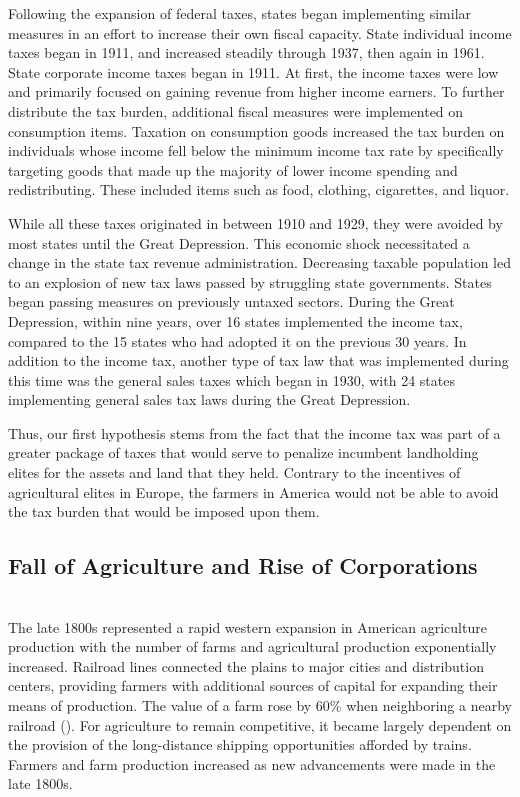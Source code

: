 \documentclass[letter, 12pt]{article}
\begin{document}
Following the expansion of federal taxes, states began implementing similar measures in an effort to increase their own fiscal capacity. State individual income taxes began in 1911, and increased steadily through 1937, then again in 1961. State corporate income taxes began in 1911. At first, the income taxes were low and primarily focused on gaining revenue from higher income earners. To further distribute the tax burden, additional fiscal measures were implemented on consumption items. Taxation on consumption goods increased the tax burden on individuals whose income fell below the minimum income tax rate by specifically targeting goods that made up the majority of lower income spending and redistributing. These included items such as food, clothing, cigarettes, and liquor.

While all these taxes originated in between 1910 and 1929, they were avoided by most states until the Great Depression. This economic shock necessitated a change in the state tax revenue administration. Decreasing taxable population led to an explosion of new tax laws passed by struggling state governments. States began passing measures on previously untaxed sectors. During the Great Depression, within nine years, over 16 states implemented the income tax, compared to the 15 states who had adopted it on the previous 30 years. In addition to the income tax, another type of tax law that was implemented during this time was the general sales taxes which began in 1930, with 24 states implementing general sales tax laws during the Great Depression. 

Thus, our first hypothesis stems from the fact that the income tax was part of a greater package of taxes that would serve to penalize incumbent landholding elites for the assets and land that they held. Contrary to the incentives of agricultural elites in Europe, the farmers in America would not be able to avoid the tax burden that would be imposed upon them. 

\subsection{Fall of Agriculture and Rise of Corporations}\hfill\\


The late 1800s represented a rapid western expansion in American agriculture production with the number of farms and agricultural production exponentially increased. Railroad lines connected the plains to major cities and distribution centers, providing farmers with additional sources of capital for expanding their means of production. The value of a farm rose by 60\% when neighboring a nearby railroad (\citealt{donaldson2016railroads}). For agriculture to remain competitive, it became largely dependent on the provision of the long-distance shipping opportunities afforded by trains. Farmers and farm production increased as new advancements were made in the late 1800s.
\end{document}
